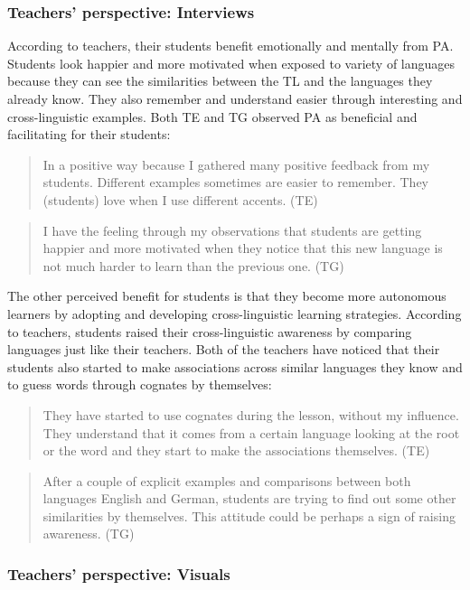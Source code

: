 \documentclass[output=paper]{../langscibook}
\begin{document}
\subsubsection{Teachers’ perspective: Interviews}
According to teachers, their students benefit emotionally and mentally from PA. Students look happier and more motivated when exposed to variety of languages because they can see the similarities between the TL and the languages they already know. They also remember and understand easier through interesting and cross-linguistic examples.  Both TE and TG observed PA as beneficial and facilitating for their students: 

\begin{quote}
In a positive way because I gathered many positive feedback from my students. Different examples sometimes are easier to remember. They (students) love when I use different accents. (TE) 
\end{quote}

\begin{quote}
I have the feeling through my observations that students are getting happier and more motivated when they notice that this new language is not much harder to learn than the previous one. (TG) 
\end{quote}

\noindent The other perceived benefit for students is that they become more autonomous learners by adopting and developing cross-linguistic learning strategies. According to teachers, students raised their cross-linguistic awareness by comparing languages just like their teachers. Both of the teachers have noticed that their students also started to make associations across similar languages they know and to guess words through cognates by themselves:

\begin{quote}
They have started to use cognates during the lesson, without my influence. They understand that it comes from a certain language looking at the root or the word and they start to make the associations themselves. (TE) 
\end{quote}

\begin{quote}\sloppy
After a couple of explicit examples and comparisons between both languages English and German, students are trying to find out some other similarities by themselves. This attitude could be perhaps a sign of raising awareness. (TG)   
\end{quote}


\subsubsection{Teachers’ perspective: Visuals}
\end{document}
